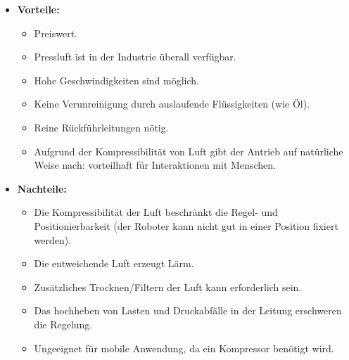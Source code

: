 \documentclass[a4paper, 11pt, accentcolor = tud3b]{tudreport}
\begin{document}
				\begin{itemize}
					\item \textbf{Vorteile:}
						\begin{itemize}
							\item Preiswert.
							\item Pressluft ist in der Industrie überall verfügbar.
							\item Hohe Geschwindigkeiten sind möglich.
							\item Keine Verunreinigung durch auslaufende Flüssigkeiten (wie Öl).
							\item Reine Rückführleitungen nötig.
							\item Aufgrund der Kompressibilität von Luft gibt der Antrieb auf natürliche Weise nach: vorteilhaft für Interaktionen mit Menschen.
						\end{itemize}
					\item \textbf{Nachteile:}
						\begin{itemize}
							\item Die Kompressibilität der Luft beschränkt die Regel- und Positionierbarkeit (der Roboter kann nicht gut in einer Position fixiert werden).
							\item Die entweichende Luft erzeugt Lärm.
							\item Zusätzliches Trocknen/Filtern der Luft kann erforderlich sein.
							\item Das hochheben von Lasten und Druckabfälle in der Leitung erschweren die Regelung.
							\item Ungeeignet für mobile Anwendung, da ein Kompressor benötigt wird.
						\end{itemize}
				\end{itemize}
\end{document}
